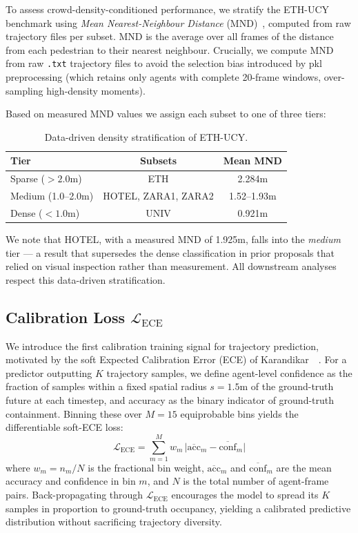 To assess crowd-density-conditioned performance, we stratify the ETH-UCY
benchmark using \emph{Mean Nearest-Neighbour Distance} (MND)~\cite{trautman2010iros},
computed from raw trajectory files per subset. MND is the average over all
frames of the distance from each pedestrian to their nearest neighbour.
Crucially, we compute MND from raw \texttt{.txt} trajectory files to avoid the
selection bias introduced by pkl preprocessing (which retains only agents with
complete 20-frame windows, over-sampling high-density moments).

Based on measured MND values we assign each subset to one of three tiers:

\begin{table}[h]
\centering
\small
\caption{Data-driven density stratification of ETH-UCY.}
\label{tab:density}
\begin{tabular}{l c c}
\toprule
Tier & Subsets & Mean MND \\
\midrule
Sparse ($>2.0$m) & ETH & 2.284m \\
Medium (1.0–2.0m) & HOTEL, ZARA1, ZARA2 & 1.52–1.93m \\
Dense ($<1.0$m) & UNIV & 0.921m \\
\bottomrule
\end{tabular}
\end{table}

We note that HOTEL, with a measured MND of 1.925m, falls into the
\emph{medium} tier — a result that supersedes the dense classification
in prior proposals that relied on visual inspection rather than measurement.
All downstream analyses respect this data-driven stratification.

\subsection{Calibration Loss $\mathcal{L}_{\text{ECE}}$}
\label{sec:method:ece}

We introduce the first calibration training signal for trajectory prediction,
motivated by the soft Expected Calibration Error (ECE) of
Karandikar~\etal~\cite{karandikar2021soft}. For a predictor outputting $K$
trajectory samples, we define agent-level confidence as the fraction of
samples within a fixed spatial radius $s = 1.5$m of the ground-truth future
at each timestep, and accuracy as the binary indicator of ground-truth
containment. Binning these over $M = 15$ equiprobable bins yields the
differentiable soft-ECE loss:
%
\begin{equation}
  \mathcal{L}_{\text{ECE}} = \sum_{m=1}^{M} w_m \,
  \bigl| \overline{\text{acc}}_m - \overline{\text{conf}}_m \bigr|
  \label{eq:lece}
\end{equation}
%
where $w_m = n_m / N$ is the fractional bin weight, $\overline{\text{acc}}_m$
and $\overline{\text{conf}}_m$ are the mean accuracy and confidence in bin $m$,
and $N$ is the total number of agent-frame pairs. Back-propagating through
$\mathcal{L}_{\text{ECE}}$ encourages the model to spread its $K$ samples in
proportion to ground-truth occupancy, yielding a calibrated predictive
distribution without sacrificing trajectory diversity.

